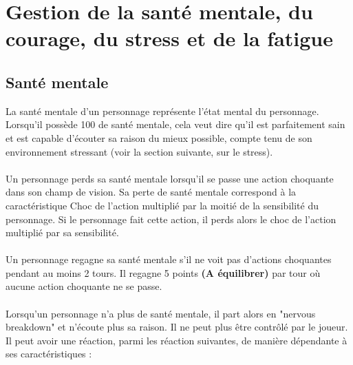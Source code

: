 \section{Gestion de la santé mentale, du courage, du stress et de la fatigue}
\subsection{Santé mentale}
La santé mentale d'un personnage représente l'état mental du personnage. Lorsqu'il possède 100 de santé mentale, cela veut dire qu'il est parfaitement sain et est capable d'écouter sa raison du mieux possible, compte tenu de son environnement stressant (voir la section suivante, sur le stress).
\\\\
Un personnage perds sa santé mentale lorsqu'il se passe une action choquante dans son champ de vision. Sa perte de santé mentale correspond à la caractéristique Choc de l'action multiplié par la moitié de la sensibilité du personnage. Si le personnage fait cette action, il perds alors le choc de l'action multiplié par sa sensibilité.
\\\\
Un personnage regagne sa santé mentale s'il ne voit pas d'actions choquantes pendant au moins 2 tours. Il regagne 5 points \textbf{(A équilibrer)} par tour où aucune action choquante ne se passe.
\\\\
Lorsqu'un personnage n'a plus de santé mentale, il part alors en "nervous breakdown" et n'écoute plus sa raison. Il ne peut plus être contrôlé par le joueur. Il peut avoir une réaction, parmi les réaction suivantes, de manière dépendante à ses caractéristiques :
